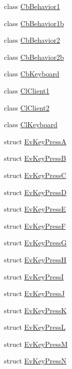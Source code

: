 \begin{DoxyCompactItemize}
\item 
class \hyperlink{classsm__three__some_1_1CbBehavior1}{Cb\+Behavior1}
\item 
class \hyperlink{classsm__three__some_1_1CbBehavior1b}{Cb\+Behavior1b}
\item 
class \hyperlink{classsm__three__some_1_1CbBehavior2}{Cb\+Behavior2}
\item 
class \hyperlink{classsm__three__some_1_1CbBehavior2b}{Cb\+Behavior2b}
\item 
class \hyperlink{classsm__three__some_1_1CbKeyboard}{Cb\+Keyboard}
\item 
class \hyperlink{classsm__three__some_1_1ClClient1}{Cl\+Client1}
\item 
class \hyperlink{classsm__three__some_1_1ClClient2}{Cl\+Client2}
\item 
class \hyperlink{classsm__three__some_1_1ClKeyboard}{Cl\+Keyboard}
\item 
struct \hyperlink{structsm__three__some_1_1EvKeyPressA}{Ev\+Key\+PressA}
\item 
struct \hyperlink{structsm__three__some_1_1EvKeyPressB}{Ev\+Key\+PressB}
\item 
struct \hyperlink{structsm__three__some_1_1EvKeyPressC}{Ev\+Key\+PressC}
\item 
struct \hyperlink{structsm__three__some_1_1EvKeyPressD}{Ev\+Key\+PressD}
\item 
struct \hyperlink{structsm__three__some_1_1EvKeyPressE}{Ev\+Key\+PressE}
\item 
struct \hyperlink{structsm__three__some_1_1EvKeyPressF}{Ev\+Key\+PressF}
\item 
struct \hyperlink{structsm__three__some_1_1EvKeyPressG}{Ev\+Key\+PressG}
\item 
struct \hyperlink{structsm__three__some_1_1EvKeyPressH}{Ev\+Key\+PressH}
\item 
struct \hyperlink{structsm__three__some_1_1EvKeyPressI}{Ev\+Key\+PressI}
\item 
struct \hyperlink{structsm__three__some_1_1EvKeyPressJ}{Ev\+Key\+PressJ}
\item 
struct \hyperlink{structsm__three__some_1_1EvKeyPressK}{Ev\+Key\+PressK}
\item 
struct \hyperlink{structsm__three__some_1_1EvKeyPressL}{Ev\+Key\+PressL}
\item 
struct \hyperlink{structsm__three__some_1_1EvKeyPressM}{Ev\+Key\+PressM}
\item 
struct \hyperlink{structsm__three__some_1_1EvKeyPressN}{Ev\+Key\+PressN}

\end{DoxyCompactItemize}
